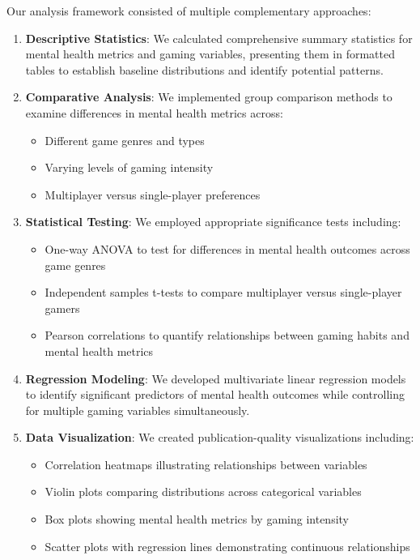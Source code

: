 \documentclass[12pt]{article}
\begin{document}
Our analysis framework consisted of multiple complementary approaches:

\begin{enumerate}
    \item \textbf{Descriptive Statistics}: We calculated comprehensive summary statistics for mental health metrics and gaming variables, presenting them in formatted tables to establish baseline distributions and identify potential patterns.

    \item \textbf{Comparative Analysis}: We implemented group comparison methods to examine differences in mental health metrics across:
    \begin{itemize}
        \item Different game genres and types
        \item Varying levels of gaming intensity
        \item Multiplayer versus single-player preferences
    \end{itemize}

    \item \textbf{Statistical Testing}: We employed appropriate significance tests including:
    \begin{itemize}
        \item One-way ANOVA to test for differences in mental health outcomes across game genres
        \item Independent samples t-tests to compare multiplayer versus single-player gamers
        \item Pearson correlations to quantify relationships between gaming habits and mental health metrics
    \end{itemize}

    \item \textbf{Regression Modeling}: We developed multivariate linear regression models to identify significant predictors of mental health outcomes while controlling for multiple gaming variables simultaneously.

    \item \textbf{Data Visualization}: We created publication-quality visualizations including:
    \begin{itemize}
        \item Correlation heatmaps illustrating relationships between variables
        \item Violin plots comparing distributions across categorical variables
        \item Box plots showing mental health metrics by gaming intensity
        \item Scatter plots with regression lines demonstrating continuous relationships
    \end{itemize}
\end{enumerate}
\end{document}
